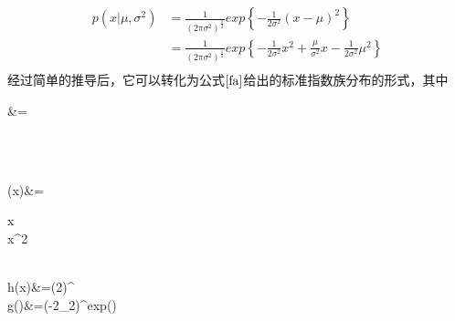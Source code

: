 \begin{enumerate}
\begin{equation}
\begin{aligned}
		p(x|\mu,\sigma^2)&=\frac{1}{(2\pi\sigma^2)^{\frac{1}{2}}}exp\left\{-\frac{1}{2\sigma^2}(x-\mu)^2 \right\}\\
		&=\frac{1}{(2\pi\sigma^2)^{\frac{1}{2}}}exp\left\{-\frac{1}{2\sigma^2}x^2+\frac{\mu}{\sigma^2}x-\frac{1}{2\sigma^2}\mu^2 \right\}\\
		\end{aligned}
	\end{equation}
	经过简单的推导后，它可以转化为公式$\ref{fa}$给出的标准指数族分布的形式，其中
	\begin{flalign}
		\eta&=\begin{pmatrix}
		\\
		\end{pmatrix}\\
		\mu(x)&=\begin{pmatrix}
		x\\x^2
		\end{pmatrix}\\
		h(x)&=(2\pi)^{}\\
		g(\eta)&=(-2\eta_2)^{}exp\left(\right)
	\end{flalign}
\end{enumerate}
